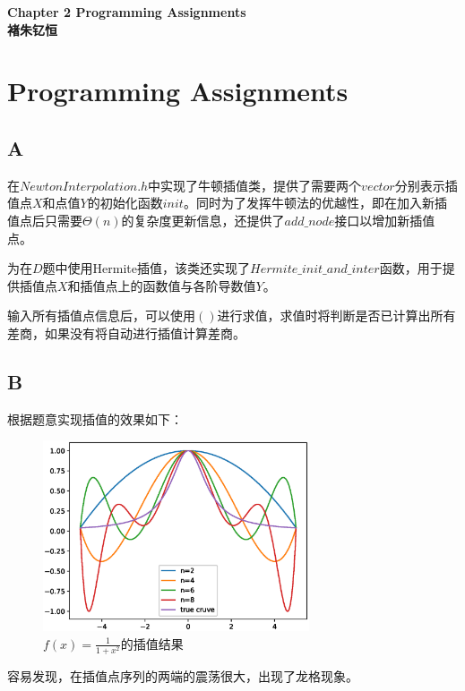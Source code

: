 \documentclass[12]{article}%
\begin{document}
\begin{center}
    \LARGE\songti\textbf{Chapter 2 Programming Assignments} \\%
    \large\kaishu\textbf{褚朱钇恒}%
\end{center}
    \section{Programming Assignments}
        \subsection{A}
            在$NewtonInterpolation.h$中实现了牛顿插值类，提供了需要两个$vector$分别表示插值点$X$和点值$Y$的初始化函数$init$。同时为了发挥牛顿法的优越性，即在加入新插值点后只需要$\Theta(n)$的复杂度更新信息，还提供了$add\_node$接口以增加新插值点。

            为在$D$题中使用Hermite插值，该类还实现了$Hermite\_init\_and\_inter$函数，用于提供插值点$X$和插值点上的函数值与各阶导数值$Y$。

            输入所有插值点信息后，可以使用$()$进行求值，求值时将判断是否已计算出所有差商，如果没有将自动进行插值计算差商。
        
        \subsection{B}

            根据题意实现插值的效果如下：
            \begin{figure}[H]
                \centering
                \includegraphics[width=0.7\textwidth]{./pic/B.eps}
                \caption{$f(x)=\frac{1}{1+x^2}$的插值结果}
            \end{figure}

            容易发现，在插值点序列的两端的震荡很大，出现了龙格现象。
        
\end{document}
